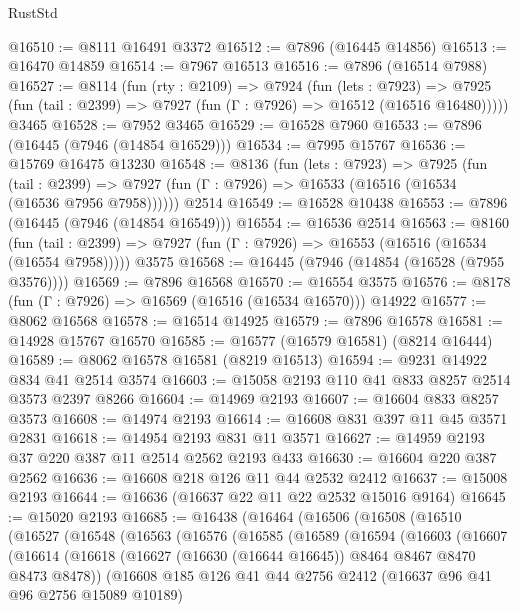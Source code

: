 \begin{lexlean}{RustStd}
\begin{coremodule}
@16510 := @8111 @16491 @3372
@16512 := @7896 (@16445 @14856)
@16513 := @16470 @14859
@16514 := @7967 @16513
@16516 := @7896 (@16514 @7988)
@16527 := @8114
    (fun (rty : @2109) =>
    @7924
      (fun (lets : @7923) =>
      @7925 (fun (tail : @2399) => @7927 (fun (Γ : @7926) => @16512 (@16516 @16480)))))
    @3465
@16528 := @7952 @3465
@16529 := @16528 @7960
@16533 := @7896 (@16445 (@7946 (@14854 @16529)))
@16534 := @7995 @15767
@16536 := @15769 @16475 @13230
@16548 := @8136
    (fun (lets : @7923) =>
    @7925
      (fun (tail : @2399) =>
      @7927 (fun (Γ : @7926) => @16533 (@16516 (@16534 (@16536 @7956 @7958))))))
    @2514
@16549 := @16528 @10438
@16553 := @7896 (@16445 (@7946 (@14854 @16549)))
@16554 := @16536 @2514
@16563 := @8160
    (fun (tail : @2399) => @7927 (fun (Γ : @7926) => @16553 (@16516 (@16534 (@16554 @7958)))))
    @3575
@16568 := @16445 (@7946 (@14854 (@16528 (@7955 @3576))))
@16569 := @7896 @16568
@16570 := @16554 @3575
@16576 := @8178 (fun (Γ : @7926) => @16569 (@16516 (@16534 @16570))) @14922
@16577 := @8062 @16568
@16578 := @16514 @14925
@16579 := @7896 @16578
@16581 := @14928 @15767 @16570
@16585 := @16577 (@16579 @16581) (@8214 @16444)
@16589 := @8062 @16578 @16581 (@8219 @16513)
@16594 := @9231 @14922 @834 @41 @2514 @3574
@16603 := @15058 @2193 @110 @41 @833 @8257 @2514 @3573 @2397 @8266
@16604 := @14969 @2193
@16607 := @16604 @833 @8257 @3573
@16608 := @14974 @2193
@16614 := @16608 @831 @397 @11 @45 @3571 @2831
@16618 := @14954 @2193 @831 @11 @3571
@16627 := @14959 @2193 @37 @220 @387 @11 @2514 @2562 @2193 @433
@16630 := @16604 @220 @387 @2562
@16636 := @16608 @218 @126 @11 @44 @2532 @2412
@16637 := @15008 @2193
@16644 := @16636 (@16637 @22 @11 @22 @2532 @15016 @9164)
@16645 := @15020 @2193
@16685 := @16438
    (@16464
      (@16506
        (@16508
          (@16510
            (@16527
              (@16548
                (@16563
                  (@16576
                    (@16585
                      (@16589
                        (@16594
                          (@16603
                            (@16607
                              (@16614
                                (@16618
                                  (@16627 (@16630 (@16644 @16645)) @8464 @8467 @8470 @8473 @8478))
                                (@16608
                                  @185
                                  @126
                                  @41
                                  @44
                                  @2756
                                  @2412
                                  (@16637 @96 @41 @96 @2756 @15089 @10189)

\end{coremodule}
\end{lexlean}
